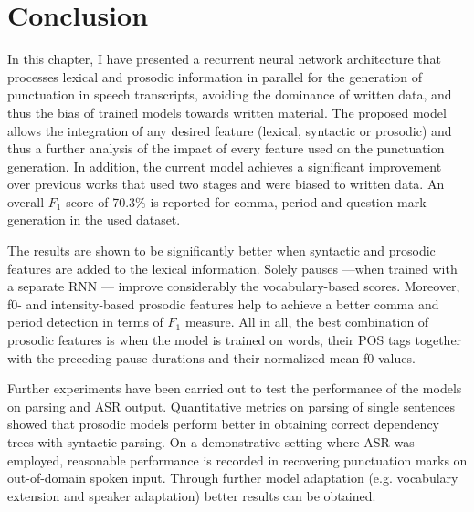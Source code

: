 \section{Conclusion}
\label{punkProse:discussion}
In this chapter, I have presented a recurrent neural network architecture that processes lexical and prosodic information in parallel for the generation of punctuation in speech transcripts, avoiding the dominance of written data, and thus the bias of trained models towards written material. The proposed model allows the integration of any desired feature (lexical, syntactic or prosodic) and thus a further analysis of the impact of every feature used on the punctuation generation. In addition, the current model achieves a significant improvement over previous works that used two stages and were biased to written data. An overall $F_1$ score of 70.3\% is reported for comma, period and question mark generation in the used dataset. 


The results are shown to be significantly better when syntactic and prosodic features are added to the lexical information. Solely pauses ---when trained with a separate RNN --- improve considerably the vocabulary-based scores. Moreover, f0- and intensity-based prosodic features help to achieve a better comma and period detection in terms of $F_1$ measure. All in all, the best combination of prosodic features is when the model is trained on words, their POS tags together with the preceding pause durations and their normalized mean f0 values. 

Further experiments have been carried out to test the performance of the models on parsing and ASR output. Quantitative metrics on parsing of single sentences showed that prosodic models perform better in obtaining correct dependency trees with syntactic parsing. On a demonstrative setting where ASR was employed, reasonable performance is recorded in recovering punctuation marks on out-of-domain spoken input. Through further model adaptation (e.g. vocabulary extension and speaker adaptation) better results can be obtained.


